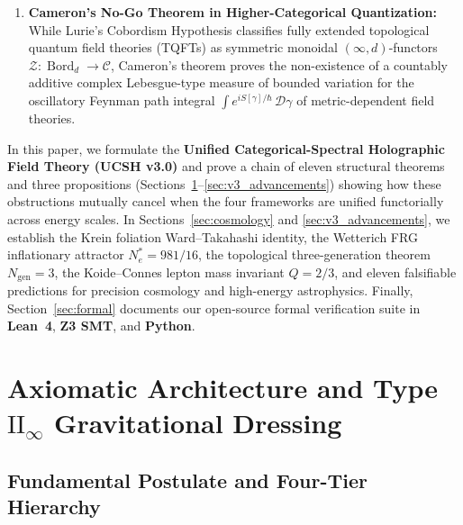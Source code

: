 \documentclass[11pt,a4paper]{article}
\theoremstyle{plain}
\theoremstyle{definition}
\theoremstyle{remark}
\newcommand{\Bord}{\operatorname{Bord}}
\begin{document}
\begin{enumerate}[label=(\arabic*)]
  \item \textbf{Cameron's No-Go Theorem in Higher-Categorical Quantization:} While Lurie's Cobordism Hypothesis \cite{Lurie2009} classifies fully extended topological quantum field theories (TQFTs) as symmetric monoidal $(\infty,d)$-functors $\mathcal{Z}: \Bord_d \to \mathcal{C}$, Cameron's theorem \cite{Cameron1960} proves the non-existence of a countably additive complex Lebesgue-type measure of bounded variation for the oscillatory Feynman path integral $\int e^{i S[\gamma]/\hbar}\,\mathcal{D}\gamma$ of metric-dependent field theories.
\end{enumerate}

In this paper, we formulate the \textbf{Unified Categorical-Spectral Holographic Field Theory (UCSH v3.0)} and prove a chain of eleven structural theorems and three propositions (Sections~\ref{sec:algebraic}--\ref{sec:v3_advancements}) showing how these obstructions mutually cancel when the four frameworks are unified functorially across energy scales. In Sections~\ref{sec:cosmology} and \ref{sec:v3_advancements}, we establish the Krein foliation Ward--Takahashi identity, the Wetterich FRG inflationary attractor $N_e^* = 981/16$, the topological three-generation theorem $N_{\mathrm{gen}} = 3$, the Koide--Connes lepton mass invariant $Q = 2/3$, and eleven falsifiable predictions for precision cosmology and high-energy astrophysics. Finally, Section~\ref{sec:formal} documents our open-source formal verification suite in \textbf{Lean~4}, \textbf{Z3 SMT}, and \textbf{Python}.

\section{Axiomatic Architecture and Type $\mathrm{II}_\infty$ Gravitational Dressing}
\label{sec:algebraic}

\subsection{Fundamental Postulate and Four-Tier Hierarchy}
\end{document}
